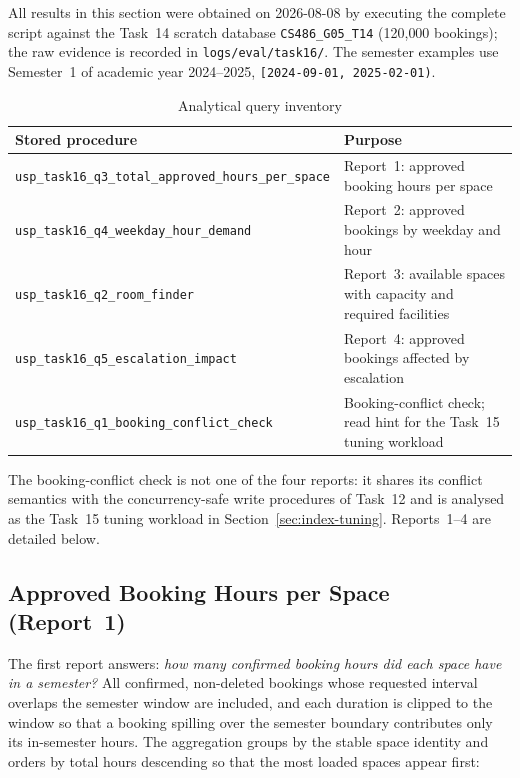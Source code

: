 All results in this section were obtained on 2026-08-08 by executing the
complete script against the Task~14 scratch database
\texttt{CS486\_G05\_T14} (120{,}000 bookings); the raw evidence is recorded in
\texttt{logs/eval/task16/}. The semester examples use Semester~1 of academic
year 2024--2025, \texttt{[2024-09-01, 2025-02-01)}.

\begin{table}[htbp]
    \centering
    \small
    \begin{tabularx}{\textwidth}{X X}
        \toprule
        \textbf{Stored procedure} & \textbf{Purpose} \\
        \midrule
        \nolinkurl{usp_task16_q3_total_approved_hours_per_space} &
        Report~1: approved booking hours per space \\
        \nolinkurl{usp_task16_q4_weekday_hour_demand} &
        Report~2: approved bookings by weekday and hour \\
        \nolinkurl{usp_task16_q2_room_finder} &
        Report~3: available spaces with capacity and required facilities \\
        \nolinkurl{usp_task16_q5_escalation_impact} &
        Report~4: approved bookings affected by escalation \\
        \nolinkurl{usp_task16_q1_booking_conflict_check} &
        Booking-conflict check; read hint for the Task~15 tuning workload \\
        \bottomrule
    \end{tabularx}
    \caption{Analytical query inventory}
    \label{tab:aq-inventory}
\end{table}

The booking-conflict check is not one of the four reports: it shares its
conflict semantics with the concurrency-safe write procedures of Task~12 and
is analysed as the Task~15 tuning workload in
Section~\ref{sec:index-tuning}. Reports~1--4 are detailed below.

\subsection{Approved Booking Hours per Space (Report~1)}

The first report answers: \emph{how many confirmed booking hours did each
space have in a semester?} All confirmed, non-deleted bookings whose requested
interval overlaps the semester window are included, and each duration is
clipped to the window so that a booking spilling over the semester boundary
contributes only its in-semester hours. The aggregation groups by the stable
space identity and orders by total hours descending so that the most loaded
spaces appear first:

